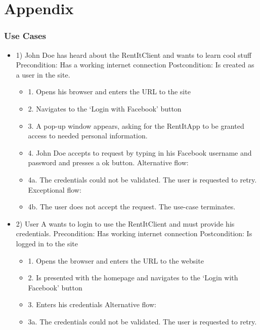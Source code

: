 \part{Appendix}
\section{Use Cases} \label{UseCases}
\begin{itemize}

\item 1)
John Doe has heard about the RentItClient and wants to learn cool stuff
\newline Precondition: Has a working internet connection
\newline Postcondition: Is created as a user in the site. 
\begin{itemize}
    \item 1. Opens his browser and enters the URL to the site
    \item 2. Navigates to the ‘Login with Facebook’ button
	\item 3. A pop-up window appears, asking for the RentItApp to be granted access to needed personal information.
	\item 4. John Doe accepts to request by typing in his Facebook username and password and presses a ok button. 
\newline Alternative flow:
    \item 4a. The credentials could not be validated. The user is requested to retry.
\newline Exceptional flow:
    \item 4b. The user does not accept the request. The use-case terminates.
\end{itemize}

\item 2)
User A wants to login to use the RentItClient and must provide his credentials.
\newline Precondition: Has working internet connection
\newline Postcondition: Is logged in to the site
\begin{itemize}
    \item 1. Opens the browser and enters the URL to the website
    \item 2. Is presented with the homepage and navigates to the ‘Login with Facebook’ button
    \item 3. Enters his credentials
\newline Alternative flow:
    \item 3a. The credentials could not be validated. The user is requested to retry.
\end{itemize}


\end{itemize}
